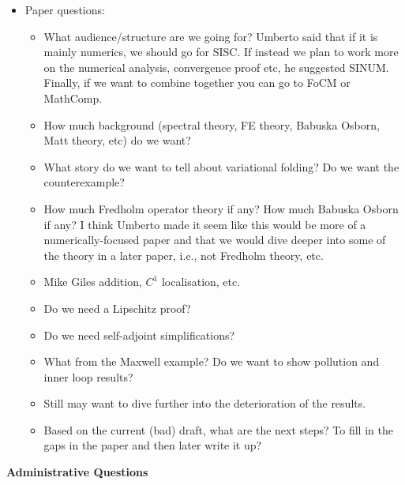 \documentclass[12pt,a4paper]{article}
\begin{document}
\begin{itemize}
 \item Paper questions:
    \begin{itemize}
    \setlength{\itemsep}{0.5em}
        \item What audience/structure are we going for? Umberto said that if it is mainly numerics, we should go for SISC. If instead we plan to work more on the numerical analysis, convergence proof etc, he suggested SINUM. Finally, if we want to combine together you can go to FoCM or MathComp. 
        \item How much background (spectral theory, FE theory, Babuska Osborn, Matt theory, etc) do we want? 
        \item What story do we want to tell about variational folding? Do we want the counterexample? 
        \item How much Fredholm operator theory if any? How much Babuska Osborn if any? I think Umberto made it seem like this would be more of a numerically-focused paper and that we would dive deeper into some of the theory in a later paper, i.e., not Fredholm theory, etc. 
        \item Mike Giles addition, $C^1$ localisation, etc.
        \item Do we need a Lipschitz proof? 
        \item Do we need self-adjoint simplifications?
        \item What from the Maxwell example? Do we want to show pollution and inner loop results? 
        \item Still may want to dive further into the deterioration of the results.
        \item Based on the current (bad) draft, what are the next steps? To fill in the gaps in the paper and then later write it up? 
    \end{itemize}
\end{itemize}

\textbf{Administrative Questions}
\end{document}
